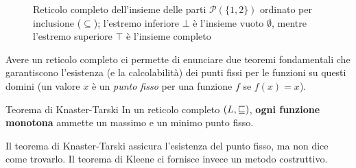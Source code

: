 \begin{figure}[htbp]
    \centering
    \caption{Reticolo completo dell'insieme delle parti $\mathcal{P}(\{1,2\})$ ordinato per inclusione ($\subseteq$); l'estremo inferiore $\bot$ è l'insieme vuoto $\emptyset$, mentre l'estremo superiore $\top$ è l'insieme completo}
\end{figure}

Avere un reticolo completo ci permette di enunciare due teoremi fondamentali che garantiscono l'esistenza (e la calcolabilità) dei punti fissi per le funzioni su questi domini (un valore $x$ è un \textit{punto fisso} per una funzione $f$ se $f(x) = x$).

\begin{defframe}{Teorema di Knaster-Tarski}{}
    In un reticolo completo $(L, \sqsubseteq)$, \textbf{ogni funzione monotona} ammette un massimo e un minimo punto fisso.
\end{defframe}

Il teorema di Knaster-Tarski assicura l'esistenza del punto fisso, ma non dice come trovarlo. Il teorema di Kleene ci fornisce invece un metodo costruttivo.

